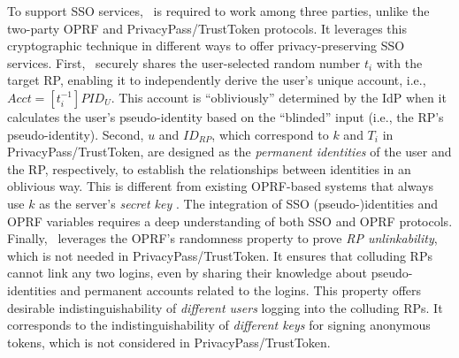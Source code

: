 To support SSO services, \usso\ is required to work among three parties, unlike the two-party OPRF and PrivacyPass/TrustToken protocols.
It leverages this cryptographic technique in different ways to offer privacy-preserving SSO services. %
First, \usso\ securely shares the user-selected random number $t_i$ with the target RP,
enabling it to independently derive the user's unique account, i.e., $Acct = [t_i^{-1}]PID_{U}$. This account is ``obliviously'' determined by the IdP when it calculates the user's pseudo-identity based on the ``blinded'' input (i.e., the RP's pseudo-identity). Second, $u$ and $ID_{RP}$, which correspond to $k$ and $T_i$ in PrivacyPass/TrustToken, are designed as the \emph{permanent identities} of the user and the RP, respectively, to establish the relationships between identities in an oblivious way.
This is different from existing OPRF-based systems that always use $k$ as the server's \emph{secret key} \cite{privacypass, trusttoken, strong-oprf, oprf-bitcoin-wallet, pesto, oprf-ot-si, pp-ss, Private-Contact-Discovery, o-kms, oprf-deduplication}.
The integration of SSO (pseudo-)identities  and OPRF variables requires a deep understanding of both SSO and OPRF protocols.
Finally, \usso\ leverages the OPRF's randomness property to prove \emph{RP unlinkability}, which is not needed in PrivacyPass/TrustToken.
It ensures that colluding RPs cannot link any two logins, %
even by sharing their knowledge about pseudo-identities and permanent accounts related to the logins.
This property offers desirable indistinguishability of \emph{different users} logging into the colluding RPs.
It corresponds to the indistinguishability of \emph{different keys} for signing anonymous tokens, which is not considered in PrivacyPass/TrustToken. %

